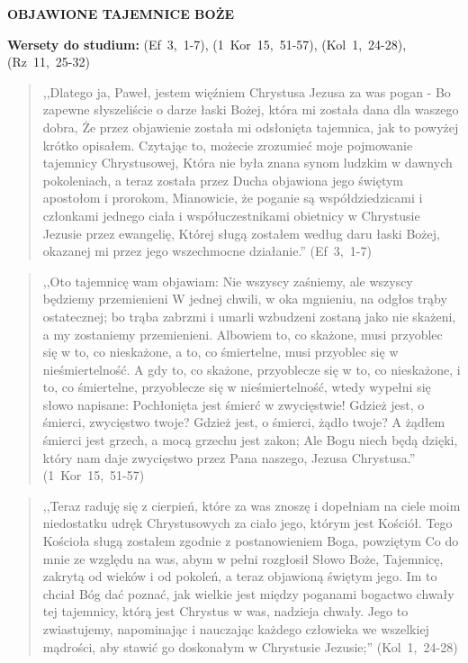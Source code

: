 \documentclass[10pt,a4paper,oneside]{article}
\begin{document}
\centerline{\textbf{\MakeUppercase{Objawione tajemnice Boże}}}
\begin{center}
\textbf{Wersety do studium:} (Ef~3,~1-7), (1~Kor~15,~51-57), (Kol~1,~24-28), (Rz~11,~25-32)
\end{center}
\begin{quote}
,,Dlatego ja, Paweł, jestem więźniem Chrystusa Jezusa za was pogan - Bo zapewne słyszeliście o darze łaski Bożej, która mi została dana dla waszego dobra, Że przez objawienie została mi odsłonięta tajemnica, jak to powyżej krótko opisałem. Czytając to, możecie zrozumieć moje pojmowanie tajemnicy Chrystusowej, Która nie była znana synom ludzkim w dawnych pokoleniach, a teraz została przez Ducha objawiona jego świętym apostołom i prorokom, Mianowicie, że poganie są współdziedzicami i członkami jednego ciała i współuczestnikami obietnicy w Chrystusie Jezusie przez ewangelię, Której sługą zostałem według daru łaski Bożej, okazanej mi przez jego wszechmocne działanie.'' (Ef~3,~1-7)
\end{quote}
\begin{quote}
,,Oto tajemnicę wam objawiam: Nie wszyscy zaśniemy, ale wszyscy będziemy przemienieni W jednej chwili, w oka mgnieniu, na odgłos trąby ostatecznej; bo trąba zabrzmi i umarli wzbudzeni zostaną jako nie skażeni, a my zostaniemy przemienieni. Albowiem to, co skażone, musi przyoblec się w to, co nieskażone, a to, co śmiertelne, musi przyoblec się w nieśmiertelność. A gdy to, co skażone, przyoblecze się w to, co nieskażone, i to, co śmiertelne, przyoblecze się w nieśmiertelność, wtedy wypełni się słowo napisane: Pochłonięta jest śmierć w zwycięstwie! Gdzież jest, o śmierci, zwycięstwo twoje? Gdzież jest, o śmierci, żądło twoje? A żądłem śmierci jest grzech, a mocą grzechu jest zakon; Ale Bogu niech będą dzięki, który nam daje zwycięstwo przez Pana naszego, Jezusa Chrystusa.'' (1~Kor~15,~51-57)
\end{quote}
\begin{quote}
,,Teraz raduję się z cierpień, które za was znoszę i dopełniam na ciele moim niedostatku udręk Chrystusowych za ciało jego, którym jest Kościół. Tego Kościoła sługą zostałem zgodnie z postanowieniem Boga, powziętym Co do mnie ze względu na was, abym w pełni rozgłosił Słowo Boże, Tajemnicę, zakrytą od wieków i od pokoleń, a teraz objawioną świętym jego. Im to chciał Bóg dać poznać, jak wielkie jest między poganami bogactwo chwały tej tajemnicy, którą jest Chrystus w was, nadzieja chwały. Jego to zwiastujemy, napominając i nauczając każdego człowieka we wszelkiej mądrości, aby stawić go doskonałym w Chrystusie Jezusie;'' (Kol~1,~24-28)
\end{quote}
\end{document}
